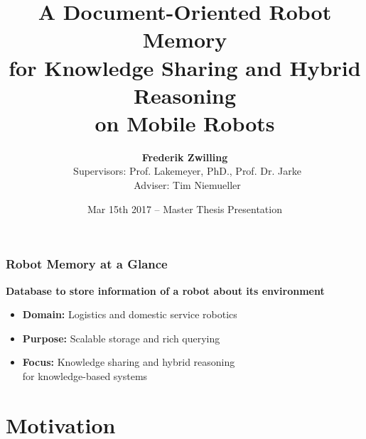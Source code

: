 




\usepackage{todonotes}
\usepackage{booktabs}
\newcommand{\tabitem}{~~\llap{\textcolor{FawkesOrange}{\textbullet}}~~}



\title[Robot Memory] {A Document-Oriented Robot Memory\\ for
  Knowledge Sharing and Hybrid Reasoning\\ on Mobile Robots}
\author[Zwilling]{
  \textbf{Frederik Zwilling}\\
  ~Supervisors: Prof. Lakemeyer, PhD., Prof. Dr. Jarke\\
  ~Adviser: Tim Niemueller
}
\def\projecturl{}

\date[Mar 15th 2017]{Mar 15th 2017 -- Master Thesis Presentation}



\frame[plain]{\titlepage}
\addtocounter{framenumber}{-1}

\begin{frame}[plain]
  \frametitle{Robot Memory at a Glance}
  \textbf{\large Database to store information of a robot about its environment}
  \bigskip
  \begin{itemize}
  \item \textbf{Domain:} Logistics and domestic service robotics
  \item \textbf{Purpose:} Scalable storage and rich querying
  \item \textbf{Focus:} Knowledge sharing and hybrid reasoning\\ for knowledge-based systems
  \end{itemize}
\end{frame}

\addtocounter{framenumber}{-1}

\section{Motivation}
\begin{frame}[plain]
  \tableofcontents[currentsection]
\end{frame}
\addtocounter{framenumber}{-1}

